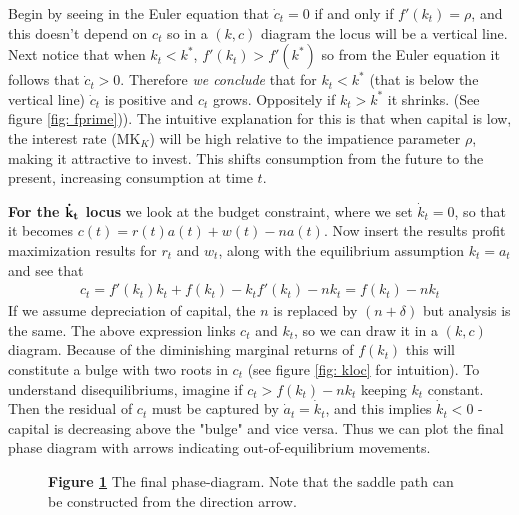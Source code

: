 \documentclass[12pt, a4paper]{article}
\begin{document}
\begin{spacing}{1.213}
Begin by seeing in the Euler equation that $\dot{c}_t = 0$ if and only if $f'(k_t)=\rho$, and this doesn't depend on $c_t$ so in a $(k,c)$ diagram the locus will be a vertical line.
Next notice that when $k_t<k^*$, $f'(k_t)>f'(k^*)$ so from the Euler equation it follows that $\dot{c}_t>0$. Therefore \textit{we conclude} that for $k_t<k^*$ (that is below the vertical line) $\dot{c}_t$ is positive and $c_t$ grows. Oppositely if $k_t>k^*$ it shrinks. (See figure \ref{fig: fprime})). The intuitive explanation for this is that when capital is low, the interest rate (MK$_K$) will be high relative to the impatience parameter $\rho$, making it attractive to invest. This shifts consumption from the future to the present, increasing consumption at time $t$. 

\textbf{For the $\bf\dot{k}_t$ locus} we look at the budget constraint, where we set $\dot{k}_t=0$, so that it becomes $c(t) = r(t)a(t) + w(t) - n a(t)$. Now insert the results profit maximization results for $r_t$ and $w_t$, along with the equilibrium assumption $k_t=a_t$ and see that
\begin{align*}
c_t = f'(k_t)k_t+f(k_t)-k_t f'(k_t) - nk_t = f(k_t) - nk_t
\end{align*}
If we assume depreciation of capital, the $n$ is replaced by $(n+\delta)$ but analysis is the same. The above expression links $c_t$ and $k_t$, so we can draw it in a $(k,c)$ diagram. Because of the diminishing marginal returns of $f(k_t)$ this will constitute a bulge with two roots in $c_t$ (see figure \ref{fig: kloc} for intuition). To understand disequilibriums, imagine if $c_t> f(k_t)-n k_t$ keeping $k_t$ constant. Then the residual of $c_t$ must be captured by $\dot{a}_t = \dot{k}_t $, and this implies $\dot{k}_t < 0$ - capital is decreasing above the "bulge" and vice versa. Thus we can plot the final phase diagram with arrows indicating out-of-equilibrium movements.

\begin{figure}[h]
\centering
{}\label{fig: phases}
\begin{minipage}{0.5\textwidth} %
\def\svgwidth{\columnwidth}

{\footnotesize \textbf{Figure \ref{fig: phases}}
The final phase-diagram. Note that the saddle path can be constructed from the direction arrow.
\par}
\end{minipage}
\end{figure}


\end{spacing}
\end{document}
